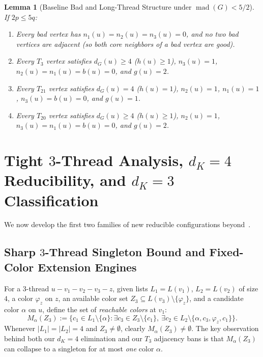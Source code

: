 \documentclass[11pt,a4paper]{article}
\newtheorem{lemma}[theorem]{Lemma}
\theoremstyle{definition}
\newcommand{\mad}{\operatorname{mad}}
\begin{document}
\begin{lemma}[Baseline Bad and Long-Thread Structure under $\mad(G) < 5/2$]\label{lem:baseline-struct}
If $2p \le 5q$:
\begin{enumerate}[label=(\roman*),leftmargin=*,itemsep=1pt]
  \item Every bad vertex has $n_1(u) = n_2(u) = n_3(u) = 0$, and no two bad vertices are adjacent (so both core neighbors of a bad vertex are good).
  \item Every $T_3$ vertex satisfies $d_G(u) \ge 4$ ($h(u) \ge 1$), $n_3(u) = 1$, $n_2(u) = n_1(u) = b(u) = 0$, and $g(u) = 2$.
  \item Every $T_{21}$ vertex satisfies $d_G(u) = 4$ ($h(u) = 1$), $n_2(u) = 1$, $n_1(u) = 1$, $n_3(u) = b(u) = 0$, and $g(u) = 1$.
  \item Every $T_{20}$ vertex satisfies $d_G(u) \ge 4$ ($h(u) \ge 1$), $n_2(u) = 1$, $n_3(u) = n_1(u) = b(u) = 0$, and $g(u) = 2$.
\end{enumerate}
\end{lemma}

\section{Tight \texorpdfstring{$3$}{3}-Thread Analysis, \texorpdfstring{$d_K=4$}{d\_K=4} Reducibility, and \texorpdfstring{$d_K=3$}{d\_K=3} Classification}\label{sec:lemmas-AB}

We now develop the first two families of new reducible configurations beyond~\cite{LuYingSong2026}.

\subsection{Sharp \texorpdfstring{$3$}{3}-Thread Singleton Bound and Fixed-Color Extension Engines}

For a $3$-thread $u - v_1 - v_2 - v_3 - z$, given lists $L_1 = L(v_1)$, $L_2 = L(v_2)$ of size $4$, a color $\varphi_z$ on $z$, an available color set $Z_3 \subseteq L(v_3) \setminus \{\varphi_z\}$, and a candidate color $\alpha$ on $u$, define the set of \emph{reachable colors} at $v_1$:
\[
  M_\alpha(Z_3) := \bigl\{c_1 \in L_1 \setminus \{\alpha\} : \exists c_3 \in Z_3 \setminus \{c_1\},\ \exists c_2 \in L_2 \setminus \{\alpha, c_3, \varphi_z, c_1\}\bigr\}.
\]
Whenever $|L_1| = |L_2| = 4$ and $Z_3 \neq \emptyset$, clearly $M_\alpha(Z_3) \neq \emptyset$. The key observation behind both our $d_K = 4$ elimination and our $T_3$ adjacency bans is that $M_\alpha(Z_3)$ can collapse to a singleton for at most \emph{one} color $\alpha$.
\end{document}
